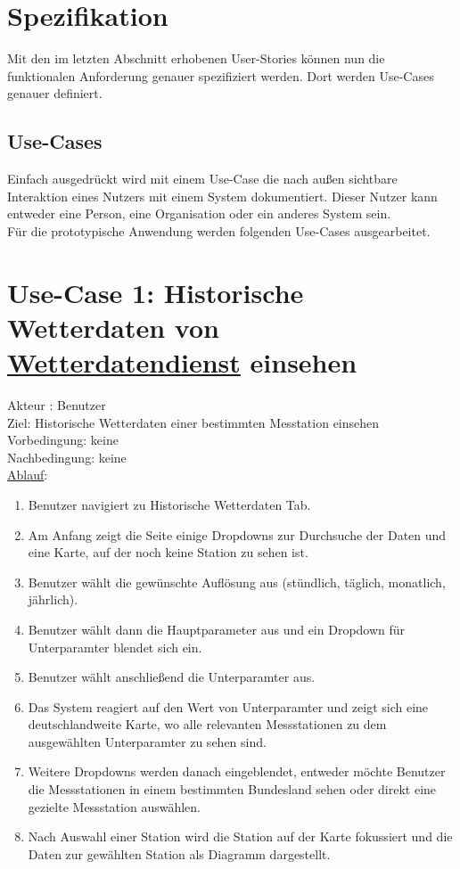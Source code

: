 \documentclass[a4paper,12pt]{scrreprt}
\begin{document}
	\section{Spezifikation}
	Mit den im letzten Abschnitt erhobenen User-Stories können nun die funktionalen Anforderung genauer spezifiziert werden. Dort werden Use-Cases genauer definiert.
	\subsection{Use-Cases}
	Einfach ausgedrückt wird mit einem Use-Case die nach außen sichtbare Interaktion eines Nutzers mit einem System dokumentiert. Dieser Nutzer kann entweder eine Person, eine Organisation oder ein anderes System sein.\\
	Für die prototypische Anwendung werden folgenden Use-Cases ausgearbeitet.
	\section*{\small \textbf{Use-Case 1: Historische Wetterdaten von \href{https://wetterdienst.readthedocs.io/en/latest/} {Wetterdatendienst} einsehen}}
	Akteur : Benutzer\\
	Ziel: Historische Wetterdaten einer bestimmten Messtation einsehen\\
	Vorbedingung: keine\\
	Nachbedingung: keine\\
	\underline{Ablauf}:
	\begin{enumerate}
		\item Benutzer navigiert zu Historische Wetterdaten Tab.
		\item Am Anfang zeigt die Seite einige Dropdowns zur Durchsuche der Daten und eine Karte, auf der noch keine Station zu sehen ist.
		\item Benutzer wählt die gewünschte Auflösung aus (stündlich, täglich, monatlich, jährlich).
		\item Benutzer wählt dann die Hauptparameter aus und ein Dropdown für Unterparamter blendet sich ein.
		\item Benutzer wählt anschließend die Unterparamter aus.
		\item Das System reagiert auf den Wert von Unterparamter und zeigt sich eine deutschlandweite Karte, wo alle relevanten Messstationen zu dem ausgewählten Unterparamter zu sehen sind. 
		\item Weitere Dropdowns werden danach eingeblendet, entweder möchte Benutzer die Messstationen in einem bestimmten Bundesland sehen oder direkt eine gezielte Messstation auswählen.
		\item Nach Auswahl einer Station wird die Station auf der Karte fokussiert und die Daten zur gewählten Station als Diagramm dargestellt. 
	\end{enumerate}
\end{document}
